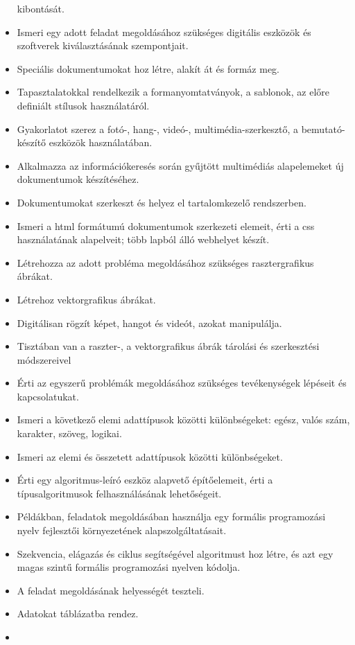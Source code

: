 \begin{itemize}
  kibontását.
\item
  Ismeri egy adott feladat megoldásához szükséges digitális eszközök és
  szoftverek kiválasztásának szempontjait.
\item
  Speciális dokumentumokat hoz létre, alakít át és formáz meg.
\item
  Tapasztalatokkal rendelkezik a formanyomtatványok, a sablonok, az
  előre definiált stílusok használatáról.
\item
  Gyakorlatot szerez a fotó-, hang-, videó-, multimédia-szerkesztő, a
  bemutató-készítő eszközök használatában.
\item
  Alkalmazza az információkeresés során gyűjtött multimédiás
  alapelemeket új dokumentumok készítéséhez.
\item
  Dokumentumokat szerkeszt és helyez el tartalomkezelő rendszerben.
\item
  Ismeri a html formátumú dokumentumok szerkezeti elemeit, érti a css
  használatának alapelveit; több lapból álló webhelyet készít.
\item
  Létrehozza az adott probléma megoldásához szükséges rasztergrafikus
  ábrákat.
\item
  Létrehoz vektorgrafikus ábrákat.
\item
  Digitálisan rögzít képet, hangot és videót, azokat manipulálja.
\item
  Tisztában van a raszter-, a vektorgrafikus ábrák tárolási és
  szerkesztési módszereivel
\item
  Érti az egyszerű problémák megoldásához szükséges tevékenységek
  lépéseit és kapcsolatukat.
\item
  Ismeri a következő elemi adattípusok közötti különbségeket: egész,
  valós szám, karakter, szöveg, logikai.
\item
  Ismeri az elemi és összetett adattípusok közötti különbségeket.
\item
  Érti egy algoritmus-leíró eszköz alapvető építőelemeit, érti a
  típusalgoritmusok felhasználásának lehetőségeit.
\item
  Példákban, feladatok megoldásában használja egy formális programozási
  nyelv fejlesztői környezetének alapszolgáltatásait.
\item
  Szekvencia, elágazás és ciklus segítségével algoritmust hoz létre, és
  azt egy magas szintű formális programozási nyelven kódolja.
\item
  A feladat megoldásának helyességét teszteli.
\item
  Adatokat táblázatba rendez.
\item

\end{itemize}
